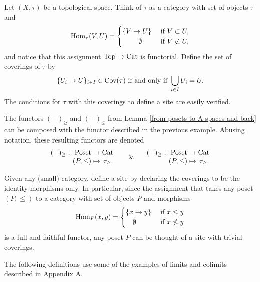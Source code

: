 \documentclass[main.tex]{subfiles}
\begin{document}
\begin{ex}\label{open sets as a site}
Let $(X,\tau)$ be a topological space. Think of $\tau$ as a category with set of objects $\tau$ and $$\operatorname{Hom}_\tau(V,U)=\begin{cases}\{V\to U\}& \text{ if } V\subset U,\\ \hspace*{.81cm} \emptyset & \text{ if } V\not\subset U,\end{cases}$$
and notice that this assignment $\operatorname{Top}\to\operatorname{Cat}$ is functorial. Define the set of coverings of $\tau$ by
$$\{U_i\to U\}_{i\in I}\in\Cov(\tau) \text{ if and only if } \bigcup_{i\in I}U_i=U.\vspace*{-3pt}$$
The conditions for $\tau$ with this coverings to define a site are easily verified.
\end{ex}

\begin{remark}\label{rmk: Poset -> Top -> site}
The functors $(-)_\geq$ and $(-)_\leq$ from Lemma \ref{from posets to A spaces and back} can be composed with the functor described in the previous example. Abusing notation, these resulting functors are denoted
$$\begin{array}{cc}
(-)_\geq:\!\! & \Poset\to\Cat \\
 & \!\!(P,\leq)\mapsto\,\tau_\geq.
\end{array} \text{\ \ \ \ \  \& \ \ \ } \begin{array}{cc}
(-)_\geq:\!\! & \Poset\to\Cat \\
 & \!\!(P,\leq)\mapsto\,\tau_\geq.
\end{array}$$
\end{remark}

\begin{ex}\label{indiscrite site on a poset}
Given any (small) category, define a site by declaring the coverings to be the identity morphisms only. In particular, since the assignment that takes any poset $(P,\leq)$ to a category with set of objects $P$ and morphisms $$\operatorname{Hom}_P(x,y)=\begin{cases}\{x\to y\}& \text{ if } x\leq y\\ \ \ \ \emptyset & \text{ if } x\nleq y\end{cases}$$ is a full and faithful functor, any poset $P$ can be thought of a site with trivial coverings.
\end{ex}

The following definitions use some of the examples of limits and colimits described in Appendix A.
\end{document}
